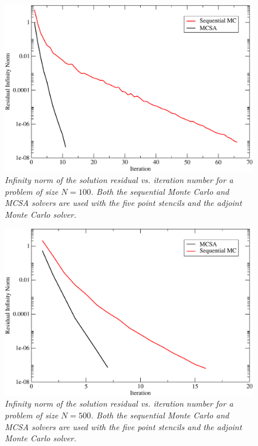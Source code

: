 \documentclass[preprint,12pt]{elsarticle}
\begin{document}
\begin{figure}[ht!]
  \centering
  \includegraphics[width=5in,clip]{seq_conv_100.pdf}
  \caption{\sl Infinity norm of the solution residual vs. iteration
    number for a problem of size $N=100$. Both the sequential Monte
    Carlo and MCSA solvers are used with the five point stencils and
    the adjoint Monte Carlo solver.}
  \label{fig:seq_100}
\end{figure}

\begin{figure}[ht!]
  \centering
  \includegraphics[width=5in,clip]{seq_conv_500.pdf}
  \caption{\sl Infinity norm of the solution residual vs. iteration
    number for a problem of size $N=500$. Both the sequential Monte
    Carlo and MCSA solvers are used with the five point stencils and
    the adjoint Monte Carlo solver.}
  \label{fig:seq_500}
\end{figure}

\end{document}
